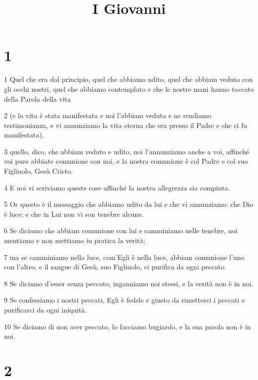 

\title{I Giovanni}


\chapter{1}

\par 1 Quel che era dal principio, quel che abbiamo udito, quel che abbiam veduto con gli occhi nostri, quel che abbiamo contemplato e che le nostre mani hanno toccato della Parola della vita
\par 2 (e la vita è stata manifestata e noi l'abbiam veduta e ne rendiamo testimonianza, e vi annunziamo la vita eterna che era presso il Padre e che ci fu manifestata),
\par 3 quello, dico, che abbiam veduto e udito, noi l'annunziamo anche a voi, affinché voi pure abbiate comunione con noi, e la nostra comunione è col Padre e col suo Figliuolo, Gesù Cristo.
\par 4 E noi vi scriviamo queste cose affinché la nostra allegrezza sia compiuta.
\par 5 Or questo è il messaggio che abbiamo udito da lui e che vi annunziamo: che Dio è luce; e che in Lui non vi son tenebre alcune.
\par 6 Se diciamo che abbiam comunione con lui e camminiamo nelle tenebre, noi mentiamo e non mettiamo in pratica la verità;
\par 7 ma se camminiamo nella luce, com'Egli è nella luce, abbiam comunione l'uno con l'altro, e il sangue di Gesù, suo Figliuolo, ci purifica da ogni peccato.
\par 8 Se diciamo d'esser senza peccato, inganniamo noi stessi, e la verità non è in noi.
\par 9 Se confessiamo i nostri peccati, Egli è fedele e giusto da rimetterci i peccati e purificarci da ogni iniquità.
\par 10 Se diciamo di non aver peccato, lo facciamo bugiardo, e la sua parola non è in noi.

\chapter{2}

